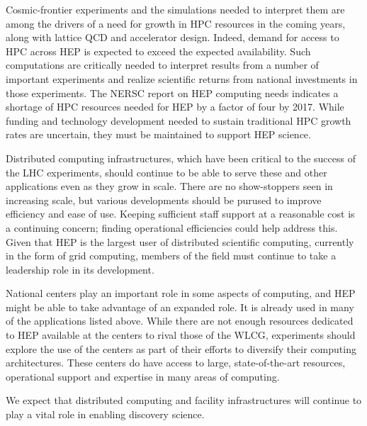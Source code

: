 Cosmic-frontier experiments and the simulations needed to interpret them are among the drivers of a need for growth in HPC resources in the coming years, along with lattice QCD and accelerator design.  Indeed, demand for access to HPC across HEP is expected to exceed the expected availability.  
Such computations are critically needed to interpret results from a number of important experiments and realize scientific returns from national investments in those experiments.  The NERSC report on HEP computing needs indicates a shortage of HPC resources needed for HEP by a factor of four by 2017.  While funding and technology development needed to sustain traditional HPC growth rates are uncertain, they must be maintained to support HEP science.

Distributed computing infrastructures, which have been critical to the success of the LHC experiments, should continue to be able to serve these and other applications even as they grow in scale.  There are no show-stoppers seen in increasing scale, but various developments should be purused to improve efficiency and ease of use.  Keeping sufficient staff support at a reasonable cost is a continuing concern; finding operational efficiencies could help address this.  Given that HEP is the largest user of distributed scientific computing, currently in the form of grid computing, members of the field must continue to take a leadership role in its development.

National centers play an important role in some aspects of computing, and HEP might be able to take advantage of an expanded role.  It is already used in many of the applications listed above.  While there are not enough resources dedicated to HEP available at the centers to rival those of the WLCG, experiments should explore the use of the centers as part of their efforts to diversify their computing architectures.  These centers do have access to large, state-of-the-art resources, operational support and expertise in many areas of computing.

We expect that distributed computing and facility infrastructures will continue to play a vital role in enabling discovery science.


